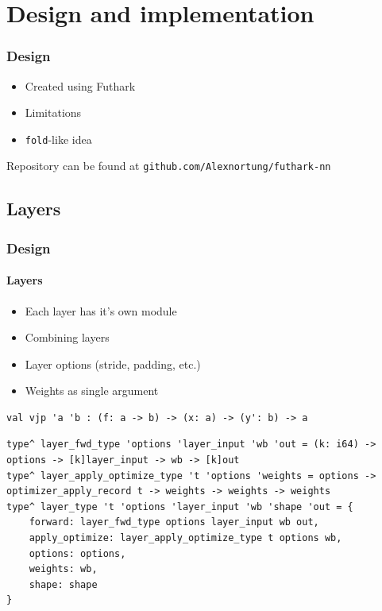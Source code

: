 \documentclass{beamer}
\begin{document}
\section{Design and implementation}

\begin{frame}
    \frametitle{Design}
    
    \begin{itemize}
        \item Created using Futhark
        \item Limitations
        \item \texttt{fold}-like idea
    \end{itemize}

    Repository can be found at \texttt{github.com/Alexnortung/futhark-nn}
\end{frame}

\subsection{Layers}

\begin{frame}[fragile]
    \frametitle{Design}
    \framesubtitle{Layers}
    
    \begin{itemize}
        \item Each layer has it's own module
        \item Combining layers
        \item Layer options (stride, padding, etc.)
        \pause
        \item Weights as single argument
    \end{itemize}

    \begin{lstlisting}
val vjp 'a 'b : (f: a -> b) -> (x: a) -> (y': b) -> a
    \end{lstlisting}

    \pause

    \begin{lstlisting}[basicstyle=\tiny]
type^ layer_fwd_type 'options 'layer_input 'wb 'out = (k: i64) -> options -> [k]layer_input -> wb -> [k]out
type^ layer_apply_optimize_type 't 'options 'weights = options -> optimizer_apply_record t -> weights -> weights -> weights
type^ layer_type 't 'options 'layer_input 'wb 'shape 'out = {
    forward: layer_fwd_type options layer_input wb out,
    apply_optimize: layer_apply_optimize_type t options wb,
    options: options,
    weights: wb,
    shape: shape
}
    \end{lstlisting}
\end{frame}
\end{document}
